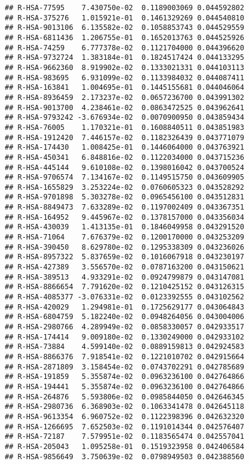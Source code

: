\documentclass[
]{article}
\begin{document}
\begin{verbatim}
## R-HSA-77595    7.430750e-02  0.1189003069 0.044592802
## R-HSA-375276   1.015921e-01  0.1461329269 0.044540810
## R-HSA-9013106  6.135582e-02  0.1058853743 0.044529559
## R-HSA-6811436  1.206755e-01  0.1652013763 0.044525926
## R-HSA-74259    6.777378e-02  0.1121704000 0.044396620
## R-HSA-9732724  1.383184e-01  0.1824517424 0.044133295
## R-HSA-9662360  8.919902e-02  0.1333021331 0.044103113
## R-HSA-983695   6.931099e-02  0.1133984032 0.044087411
## R-HSA-163841   1.004695e-01  0.1445155681 0.044046064
## R-HSA-8936459  2.173237e-02  0.0657236700 0.043991302
## R-HSA-9013700  4.238461e-02  0.0863472525 0.043962641
## R-HSA-9793242 -3.676934e-02  0.0070900950 0.043859434
## R-HSA-76005    1.170321e-01  0.1608840511 0.043851983
## R-HSA-1912420  7.446157e-02  0.1182326439 0.043771079
## R-HSA-174430   1.008425e-01  0.1446064000 0.043763921
## R-HSA-450341   6.848816e-02  0.1122034000 0.043715236
## R-HSA-445144   9.610108e-02  0.1398016042 0.043700524
## R-HSA-9706574  7.134167e-02  0.1149515750 0.043609905
## R-HSA-1655829  3.253224e-02  0.0760605323 0.043528292
## R-HSA-9701898  5.303278e-02  0.0965456100 0.043512831
## R-HSA-8849473  7.633289e-02  0.1197002409 0.043367351
## R-HSA-164952   9.445967e-02  0.1378157000 0.043356034
## R-HSA-430039   1.413135e-01  0.1846049958 0.043291520
## R-HSA-71064    7.676379e-02  0.1200170000 0.043253209
## R-HSA-390450   8.629780e-02  0.1295338309 0.043236026
## R-HSA-8957322  5.837659e-02  0.1016067918 0.043230197
## R-HSA-427389   3.556570e-02  0.0787163200 0.043150621
## R-HSA-389513   4.933291e-02  0.0924799879 0.043147081
## R-HSA-8866654  7.791620e-02  0.1210425152 0.043126315
## R-HSA-4085377 -3.076331e-02  0.0123392555 0.043102562
## R-HSA-420029   1.294981e-01  0.1725629177 0.043064843
## R-HSA-6804759  5.182240e-02  0.0948264056 0.043004006
## R-HSA-2980766  4.289949e-02  0.0858330057 0.042933517
## R-HSA-174414   9.009180e-02  0.1330249000 0.042933102
## R-HSA-73884    4.599140e-02  0.0889159813 0.042924583
## R-HSA-8866376  7.918541e-02  0.1221010702 0.042915664
## R-HSA-2871809  3.158454e-02  0.0743702291 0.042785689
## R-HSA-191859   5.355874e-02  0.0963236100 0.042764866
## R-HSA-194441   5.355874e-02  0.0963236100 0.042764866
## R-HSA-264876   5.593806e-02  0.0985844050 0.042646345
## R-HSA-2980736  6.368903e-02  0.1063341478 0.042645118
## R-HSA-9613354  6.960752e-02  0.1122398396 0.042632320
## R-HSA-1266695  7.652503e-02  0.1191014344 0.042576407
## R-HSA-72187    7.579951e-02  0.1183565474 0.042557041
## R-HSA-205043   1.095258e-01  0.1519323958 0.042406584
## R-HSA-9856649  3.750639e-02  0.0798949503 0.042388560

\end{verbatim}
\end{document}
